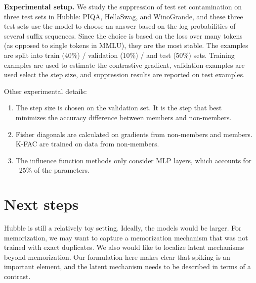 \documentclass{article}
\begin{document}
\textbf{Experimental setup.} We study the suppression of test set contamination on three test sets in Hubble: PIQA, HellaSwag, and WinoGrande, and these three test sets use the model to choose an answer based on the log probabilities of several suffix sequences. Since the choice is based on the loss over many tokens (as opposed to single tokens in MMLU), they are the most stable. The examples are split into train (40\%) / validation (10\%) / and test (50\%) sets. Training examples are used to estimate the contrastive gradient, validation examples are used select the step size, and suppression results are reported on test examples. 


Other experimental details:
\begin{enumerate}
    \item The step size is chosen on the validation set. It is the step that best minimizes the accuracy difference between members and non-members.

    \item Fisher diagonals are calculated on gradients from non-members and members. K-FAC are trained on data from non-members. 

    \item The influence function methods only consider MLP layers, which accounts for ~25\% of the parameters.
\end{enumerate}









\clearpage

\section{Next steps}


Hubble is still a relatively toy setting. Ideally, the models would be larger. For memorization, we may want to capture a memorization mechanism that was not trained with exact duplicates. We also would like to localize latent mechanisms beyond memorization. Our formulation here makes clear that spiking is an important element, and the latent mechanism needs to be described in terms of a contrast. 

\printbibliography
\end{document}
